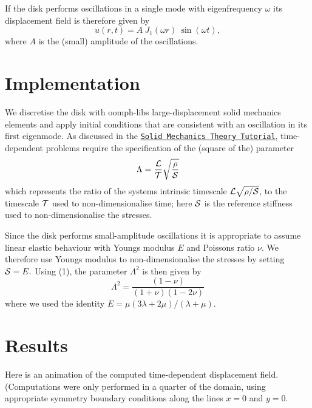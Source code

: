 If the disk performs oscillations in a single mode with eigenfrequency $ \omega $ its displacement field is therefore given by \[ u(r,t) = A \ J_1(\omega r) \ \sin(\omega t), \] where $ A $ is the (small) amplitude of the oscillations.



 

\hypertarget{index_implementation}{}\section{Implementation}\label{index_implementation}
We discretise the disk with {\ttfamily oomph-\/lib\textquotesingle{}s} large-\/displacement solid mechanics elements and apply initial conditions that are consistent with an oscillation in its first eigenmode. As discussed in the \href{../../solid_theory/html/index.html#non-dim_solid}{\tt Solid Mechanics Theory Tutorial}, time-\/dependent problems require the specification of the (square of the) parameter \[ \Lambda = \frac{{\cal L}}{{\cal T}} \sqrt{\frac{\rho}{{\cal S}}} \] which represents the ratio of the system\textquotesingle{}s intrinsic timescale $ {\cal L} \sqrt{\rho/{\cal S}} $, to the timescale $ {\cal T} $ used to non-\/dimensionalise time; here ${\cal S}$ is the reference stiffness used to non-\/dimensionalise the stresses.

Since the disk performs small-\/amplitude oscillations it is appropriate to assume linear elastic behaviour with Young\textquotesingle{}s modulus $ E $ and Poisson\textquotesingle{}s ratio $ \nu $. We therefore use Young\textquotesingle{}s modulus to non-\/dimensionalise the stresses by setting $ {\cal S} = E. $ Using (1), the parameter $ \Lambda^2 $ is then given by \[ \Lambda^2 = \frac{(1-\nu)}{(1+\nu)(1-2\nu)} \] where we used the identity $ E = \mu(3\lambda +2 \mu)/(\lambda+\mu). $



 

\hypertarget{index_results}{}\section{Results}\label{index_results}
Here is an animation of the computed time-\/dependent displacement field. (Computations were only performed in a quarter of the domain, using appropriate symmetry boundary conditions along the lines $ x=0 $ and $ y=0. $

